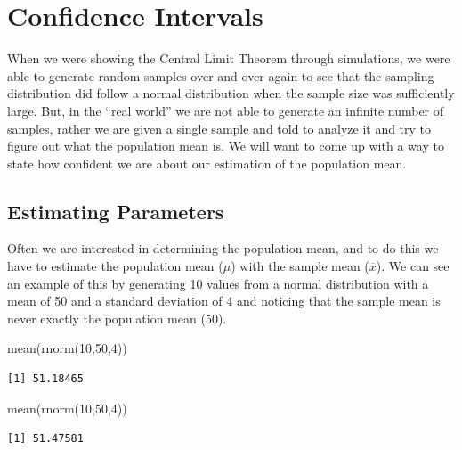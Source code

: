 \documentclass[
  letterpaper,
  DIV=11,
  numbers=noendperiod]{scrreprt}
\newenvironment{Shaded}{\begin{snugshade}}{\end{snugshade}}
\newcommand{\DecValTok}[1]{\textcolor[rgb]{0.68,0.00,0.00}{#1}}
\newcommand{\FunctionTok}[1]{\textcolor[rgb]{0.28,0.35,0.67}{#1}}
\newcommand{\NormalTok}[1]{\textcolor[rgb]{0.00,0.23,0.31}{#1}}
\begin{document}

\chapter{Confidence Intervals}\label{confidence-intervals}

When we were showing the Central Limit Theorem through simulations, we
were able to generate random samples over and over again to see that the
sampling distribution did follow a normal distribution when the sample
size was sufficiently large. But, in the ``real world'' we are not able
to generate an infinite number of samples, rather we are given a single
sample and told to analyze it and try to figure out what the population
mean is. We will want to come up with a way to state how confident we
are about our estimation of the population mean.

\section{Estimating Parameters}\label{estimating-parameters}

Often we are interested in determining the population mean, and to do
this we have to estimate the population mean (\(\mu\)) with the sample
mean (\(\overline{x}\)). We can see an example of this by generating 10
values from a normal distribution with a mean of 50 and a standard
deviation of 4 and noticing that the sample mean is never exactly the
population mean (50).

\begin{Shaded}
\begin{Highlighting}[]
\FunctionTok{mean}\NormalTok{(}\FunctionTok{rnorm}\NormalTok{(}\DecValTok{10}\NormalTok{,}\DecValTok{50}\NormalTok{,}\DecValTok{4}\NormalTok{))}
\end{Highlighting}
\end{Shaded}

\begin{verbatim}
[1] 51.18465
\end{verbatim}

\begin{Shaded}
\begin{Highlighting}[]
\FunctionTok{mean}\NormalTok{(}\FunctionTok{rnorm}\NormalTok{(}\DecValTok{10}\NormalTok{,}\DecValTok{50}\NormalTok{,}\DecValTok{4}\NormalTok{))}
\end{Highlighting}
\end{Shaded}

\begin{verbatim}
[1] 51.47581
\end{verbatim}
\end{document}
